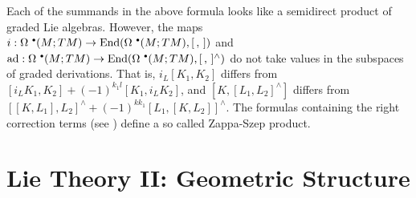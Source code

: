 \begin{rem}
    Each of the summands in the above formula looks like a semidirect product of graded Lie algebras. However, the maps $i:\Omega^{\smbullet}(M;TM)\to \End(\Omega^{\smbullet}(M;TM),[\,,\,])$ and $\ad:\Omega^{\smbullet}(M;TM)\to \End(\Omega^{\smbullet}(M;TM),[\,,\,]^{\wedge})$ do not take values in the subspaces of graded derivations. That is, $i_L[K_1,K_2]$ differs from $[i_LK_1,K_2]+(-1)^{k_1l}[K_1,i_LK_2]$, and $[K,[L_1,L_2]^{\wedge}]$ differs from $[[K,L_1],L_2]^{\wedge}+(-1)^{kk_1}[L_1,[K,L_2]]^{\wedge}$. The formulas containing the right correction terms (see \cite[8.11]{Kolar}) define a so called Zappa-Szep product.
\end{rem}













\newpage
\section{Lie Theory II: Geometric Structure}\label{sec: Lie theory ii}

